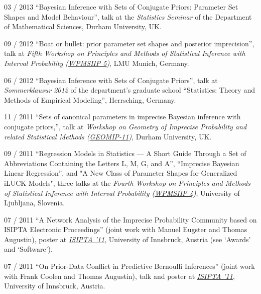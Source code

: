 \documentclass[a4paper]{simplecv}
\begin{document}
\begin{topic}
\item[03 / 2013] ``Bayesian Inference with Sets of Conjugate Priors: Parameter Set Shapes and Model Behaviour'', talk at the
                 \emph{Statistics Seminar} of the Department of Mathematical Sciences, Durham University, UK.

\item[09 / 2012] ``Boat or bullet: prior parameter set shapes and posterior imprecision'', talk at
                 \emph{Fifth Workshop on Principles and Methods of Statistical Inference with Interval Probability (\href{http://statsoz-neu.userweb.mwn.de/research/WPMSIIP_2012/}{WPMSIIP 5})},
                 LMU Munich, Germany.

\item[06 / 2012] ``Bayesian Inference with Sets of Conjugate Priors'', talk at \emph{Sommerklausur 2012} of the department's graduate school
                 ``Statistics: Theory and Methods of Empirical Modeling'', Herrsching, Germany.

\item[11 / 2011] ``Sets of canonical parameters in imprecise Bayesian inference with conjugate priors,'', talk at
                 \emph{Workshop on Geometry of Imprecise Probability and related Statistical Methods (\href{http://maths.dur.ac.uk/stats/people/fc/geomip11.html}{GEOMIP-11})}, Durham University, UK.

\item[09 / 2011] ``Regression Models in Statistics --- A Short Guide Through a Set of Abbreviations Containing the Letters L, M, G, and A'',
                 ``Imprecise Bayesian Linear Regression'', and "A New Class of Parameter Shapes for Generalized iLUCK Models",
                 three talks at the
                 \emph{Fourth Workshop on Principles and Methods of Statistical Inference with Interval Probability (\href{http://wpmsiip2011.fdvinfo.net/c/646/Information/}{WPMSIIP 4})},
                 University of Ljubljana, Slovenia.

\item[07 / 2011] ``A Network Analysis of the Imprecise Probability Community based on ISIPTA Electronic Proceedings''
                 (joint work with Manuel Eugster and Thomas Augustin),
                 poster at \emph{\href{http://www.sipta.org/isipta11/}{ISIPTA '11}}, University of Innsbruck, Austria (see `Awards' and `Software').

\item[07 / 2011] ``On Prior-Data Conflict in Predictive Bernoulli Inferences'' (joint work with Frank Coolen and Thomas Augustin),
                 talk and poster at \emph{\href{http://www.sipta.org/isipta11/}{ISIPTA '11}}, University of Innsbruck, Austria.


\end{topic}
\end{document}
